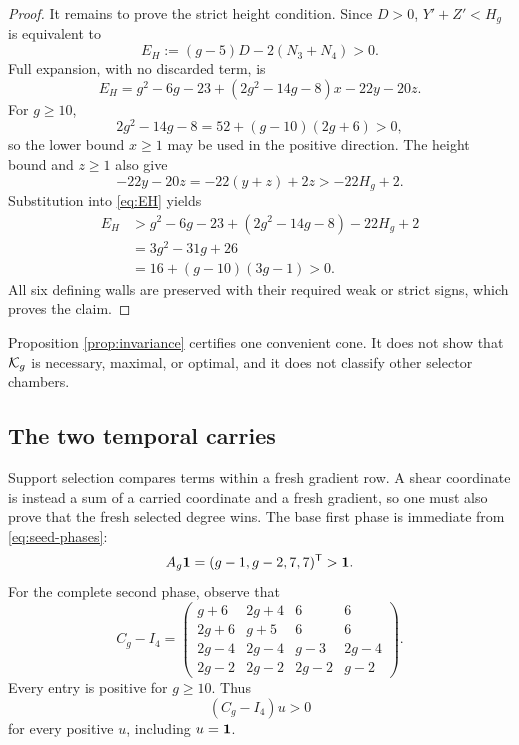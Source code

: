 \documentclass[11pt]{article}
\theoremstyle{remark}
\numberwithin{equation}{section}
\begin{document}
\begin{proof}
It remains to prove the strict height condition.  Since \(D>0\),
\(Y'+Z'<H_g\) is equivalent to
\[
E_H:=(g-5)D-2(N_3+N_4)>0.
\]
Full expansion, with no discarded term, is
\begin{equation}\label{eq:EH}
E_H=
g^2-6g-23+(2g^2-14g-8)x-22y-20z.
\end{equation}
For \(g\geq10\),
\[
2g^2-14g-8=52+(g-10)(2g+6)>0,
\]
so the lower bound \(x\geq1\) may be used in the positive direction.  The
height bound and \(z\geq1\) also give
\[
-22y-20z=-22(y+z)+2z>-22H_g+2.
\]
Substitution into \eqref{eq:EH} yields
\begin{equation}\label{eq:EH-bound}
\begin{aligned}
E_H
&>g^2-6g-23+(2g^2-14g-8)-22H_g+2\\
&=3g^2-31g+26\\
&=16+(g-10)(3g-1)>0.
\end{aligned}
\end{equation}
All six defining walls are preserved with their required weak or strict
signs, which proves the claim.
\end{proof}

Proposition \ref{prop:invariance} certifies one convenient cone.  It does
not show that \(\mathcal{K}_g\) is necessary, maximal, or optimal, and it does not
classify other selector chambers.

\subsection{The two temporal carries}

Support selection compares terms within a fresh gradient row.  A shear
coordinate is instead a sum of a carried coordinate and a fresh gradient,
so one must also prove that the fresh selected degree wins.  The base first
phase is immediate from \eqref{eq:seed-phases}:
\begin{equation}\label{eq:first-base-carry}
A_g\mathbf{1}=(g-1,g-2,7,7)^{\mathsf{T}}>\mathbf{1}.
\end{equation}
For the complete second phase, observe that
\begin{equation}\label{eq:C-minus-I}
C_g-I_4=
\begin{pmatrix}
g+6&2g+4&6&6\\
2g+6&g+5&6&6\\
2g-4&2g-4&g-3&2g-4\\
2g-2&2g-2&2g-2&g-2
\end{pmatrix}.
\end{equation}
Every entry is positive for \(g\geq10\).  Thus
\begin{equation}\label{eq:second-carry-general}
(C_g-I_4)u>0
\end{equation}
for every positive \(u\), including \(u=\mathbf{1}\).
\end{document}
